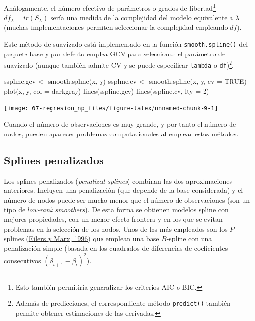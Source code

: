 \documentclass[
  spanish,
]{book}
\newenvironment{Shaded}{\begin{snugshade}}{\end{snugshade}}
\newcommand{\AttributeTok}[1]{\textcolor[rgb]{0.77,0.63,0.00}{#1}}
\newcommand{\ConstantTok}[1]{\textcolor[rgb]{0.00,0.00,0.00}{#1}}
\newcommand{\DecValTok}[1]{\textcolor[rgb]{0.00,0.00,0.81}{#1}}
\newcommand{\FunctionTok}[1]{\textcolor[rgb]{0.00,0.00,0.00}{#1}}
\newcommand{\NormalTok}[1]{#1}
\newcommand{\OtherTok}[1]{\textcolor[rgb]{0.56,0.35,0.01}{#1}}
\newcommand{\StringTok}[1]{\textcolor[rgb]{0.31,0.60,0.02}{#1}}
\theoremstyle{break}
\theoremstyle{definition}
\theoremstyle{definition}
\theoremstyle{definition}
\theoremstyle{definition}
\theoremstyle{remark}
\begin{document}
Análogamente, el número efectivo de parámetros o grados de libertad\footnote{Esto también permitiría generalizar los criterios AIC o BIC.} \(df_{\lambda}=tr(S_{\lambda})\) sería una medida de la complejidad del modelo equivalente a \(\lambda\) (muchas implementaciones permiten seleccionar la complejidad empleando \(df\)).

Este método de suavizado está implementado en la función \texttt{smooth.spline()} del paquete base y por defecto emplea GCV para seleccionar el parámetro de suavizado (aunque también admite CV y se puede especificar \texttt{lambda} o \texttt{df})\footnote{Además de predicciones, el correspondiente método \texttt{predict()} también permite obtener estimaciones de las derivadas.}.

\begin{Shaded}
\begin{Highlighting}[]
\NormalTok{sspline.gcv }\OtherTok{\textless{}{-}} \FunctionTok{smooth.spline}\NormalTok{(x, y)}
\NormalTok{sspline.cv }\OtherTok{\textless{}{-}} \FunctionTok{smooth.spline}\NormalTok{(x, y, }\AttributeTok{cv =} \ConstantTok{TRUE}\NormalTok{)}
\FunctionTok{plot}\NormalTok{(x, y, }\AttributeTok{col =} \StringTok{\textquotesingle{}darkgray\textquotesingle{}}\NormalTok{)}
\FunctionTok{lines}\NormalTok{(sspline.gcv)}
\FunctionTok{lines}\NormalTok{(sspline.cv, }\AttributeTok{lty =} \DecValTok{2}\NormalTok{)}
\end{Highlighting}
\end{Shaded}

\begin{center}\texttt{[image: 07-regresion\_np\_files/figure-latex/unnamed-chunk-9-1]} \end{center}

Cuando el número de observaciones es muy grande, y por tanto el número de nodos, pueden aparecer problemas computacionales al emplear estos métodos.

\hypertarget{splines-penalizados}{%
\subsection{Splines penalizados}\label{splines-penalizados}}

Los splines penalizados (\emph{penalized splines}) combinan las dos aproximaciones anteriores.
Incluyen una penalización (que depende de la base considerada) y el número de nodos puede ser mucho menor que el número de observaciones (son un tipo de \emph{low-rank smoothers}). De esta forma se obtienen modelos spline con mejores propiedades, con un menor efecto frontera y en los que se evitan problemas en la selección de los nodos.
Unos de los más empleados son los \(P\)-splines (\protect\hyperlink{ref-eilers1996flexible}{Eilers y Marx, 1996}) que emplean una base \(B\)-spline con una penalización simple (basada en los cuadrados de diferencias de coeficientes consecutivos \((\beta_{i+1} - \beta_i)^2\)).
\end{document}
